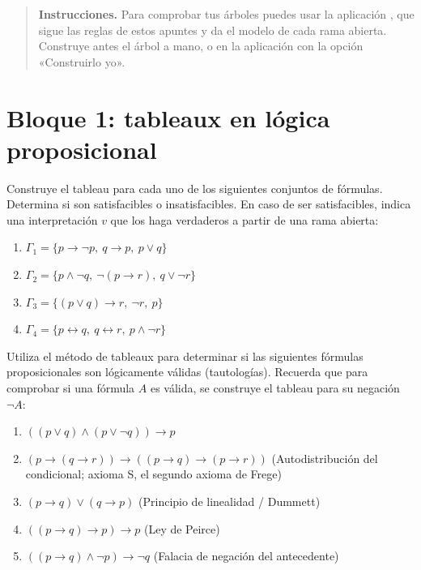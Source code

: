 \begin{quote}
\small \textbf{Instrucciones.} Para comprobar tus árboles puedes usar la aplicación \apptableaux{}, que sigue las reglas de estos apuntes y da el modelo de cada rama abierta. Construye antes el árbol a mano, o en la aplicación con la opción «Construirlo yo».
\end{quote}

\section*{Bloque 1: tableaux en lógica proposicional}

\begin{pregunta}\label{e6-1}
Construye el tableau para cada uno de los siguientes conjuntos de fórmulas. Determina si son satisfacibles o insatisfacibles. En caso de ser satisfacibles, indica una interpretación $v$ que los haga verdaderos a partir de una rama abierta:
\begin{enumerate}
    \item $\Gamma_1 = \{p \to \neg p, \ q \to p, \ p \lor q\}$
    \item $\Gamma_2 = \{p \land \neg q, \ \neg (p \to r), \ q \lor \neg r\}$
    \item $\Gamma_3 = \{(p \lor q) \to r, \ \neg r, \ p\}$
    \item $\Gamma_4 = \{p \leftrightarrow q, \ q \leftrightarrow r, \ p \land \neg r\}$
\end{enumerate}
\end{pregunta}

\begin{pregunta}\label{e6-2}
Utiliza el método de tableaux para determinar si las siguientes fórmulas proposicionales son lógicamente válidas (tautologías). Recuerda que para comprobar si una fórmula $A$ es válida, se construye el tableau para su negación $\neg A$:
\begin{enumerate}
    \item $((p \lor q) \land (p \lor \neg q)) \to p$
    \item $(p \to (q \to r)) \to ((p \to q) \to (p \to r))$ \quad (Autodistribución del condicional; axioma S, el segundo axioma de Frege)
    \item $(p \to q) \lor (q \to p)$ \quad (Principio de linealidad / Dummett)
    \item $((p \to q) \to p) \to p$ \quad (Ley de Peirce)
    \item $((p \to q) \land \neg p) \to \neg q$ \quad (Falacia de negación del antecedente)
\end{enumerate}
\end{pregunta}

